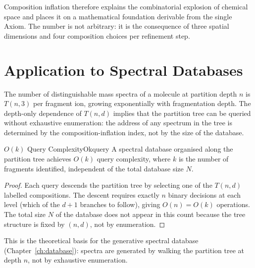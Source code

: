 Composition inflation therefore explains the combinatorial explosion of
chemical space and places it on a mathematical foundation derivable from the
single Axiom.
The number is not arbitrary: it is the consequence of three spatial dimensions
and four composition choices per refinement step.

\section{Application to Spectral Databases}
\label{sec:ch19-spectral}

The number of distinguishable mass spectra of a molecule at partition depth $n$
is $T(n,3)$ per fragment ion, growing exponentially with fragmentation depth.
The depth-only dependence of $T(n,d)$ implies that the partition tree can be
queried without exhaustive enumeration: the address of any spectrum in the tree
is determined by the composition-inflation index, not by the size of the database.

\begin{consequence}{$O(k)$ Query Complexity}{Okquery}
  A spectral database organised along the partition tree achieves $O(k)$ query
  complexity, where $k$ is the number of fragments identified, independent of
  the total database size $N$.
\end{consequence}

\begin{proof}
Each query descends the partition tree by selecting one of the $T(n,d)$
labelled compositions.
The descent requires exactly $n$ binary decisions at each level (which of the
$d+1$ branches to follow), giving $O(n) = O(k)$ operations.
The total size $N$ of the database does not appear in this count because the
tree structure is fixed by $(n,d)$, not by enumeration.
\end{proof}

\noindent
This is the theoretical basis for the generative spectral database
(Chapter~\ref{ch:database}): spectra are generated by walking the partition
tree at depth $n$, not by exhaustive enumeration.

